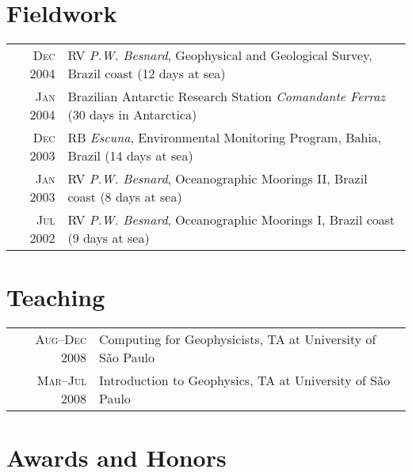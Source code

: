 \documentclass[a4paper,11pt]{article}
\begin{document}

\section{Fieldwork}

\begin{tabular}{rl}
\textsc{Dec} 2004 & RV \emph{P.W. Besnard}, Geophysical and Geological Survey, Brazil coast \footnotesize{(12 days at sea)}\\
\textsc{Jan} 2004 & Brazilian Antarctic Research Station \emph{Comandante Ferraz} \footnotesize{(30 days in Antarctica)}\\
\textsc{Dec} 2003 & RB \emph{Escuna}, Environmental Monitoring Program, Bahia, Brazil \footnotesize{(14 days at sea)}\\
\textsc{Jan} 2003 & RV \emph{P.W. Besnard}, Oceanographic Moorings II, Brazil coast \footnotesize{(8 days at sea)}\\
\textsc{Jul} 2002 & RV \emph{P.W. Besnard}, Oceanographic Moorings I, Brazil coast \footnotesize{(9 days at sea)}
\end{tabular}


\section{Teaching}

\begin{tabular}{rl}
\textsc{Aug--Dec} 2008 & Computing for Geophysicists, TA at University of S\~ao Paulo\\
\textsc{Mar--Jul} 2008 & Introduction to Geophysics, TA at University of S\~ao Paulo
\end{tabular}


\section{Awards and Honors}
\end{document}
